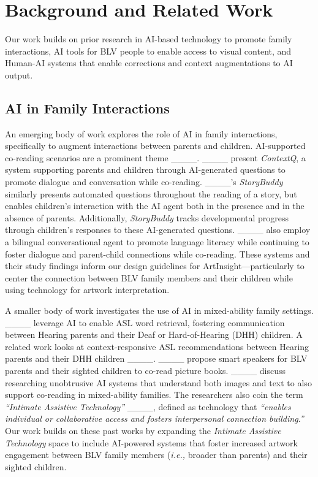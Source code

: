 \section{Background and Related Work}
Our work builds on prior research in AI-based technology to promote family interactions, AI tools for BLV people to enable access to visual content, and Human-AI systems that enable corrections and context augmentations to AI output. 

\subsection{AI in Family Interactions}
An emerging body of work explores the role of AI in family interactions, specifically to augment interactions between parents and children. AI-supported co-reading scenarios are a prominent theme ____. ____ present \textit{ContextQ}, a system supporting parents and children through AI-generated questions to promote dialogue and conversation while co-reading. ____'s \textit{StoryBuddy} similarly presents automated questions throughout the reading of a story, but enables children's interaction with the AI agent both in the presence and in the absence of parents. Additionally, \textit{StoryBuddy} tracks developmental progress through children's responses to these AI-generated questions. ____ also employ a bilingual conversational agent to promote language literacy while continuing to foster dialogue and parent-child connections while co-reading. These systems and their study findings inform our design guidelines for ArtInsight---particularly to center the connection between BLV family members and their children while using technology for artwork interpretation.

A smaller body of work investigates the use of AI in mixed-ability family settings. ____ leverage AI to enable ASL word retrieval, fostering communication between Hearing parents and their Deaf or Hard-of-Hearing (DHH) children. A related work looks at context-responsive ASL recommendations between Hearing parents and their DHH children ____. ____ propose smart speakers for BLV parents and their sighted children to co-read picture books. ____ discuss researching unobtrusive AI systems that understand both images and text to also support co-reading in mixed-ability families. The researchers also coin the term \textit{``Intimate Assistive Technology''} ____, defined as technology that \textit{``enables individual or collaborative access and fosters interpersonal connection building.''} Our work builds on these past works by expanding the \textit{Intimate Assistive Technology} space to include AI-powered systems that foster increased artwork engagement between BLV family members (\textit{i.e.,} broader than parents) and their sighted children.

